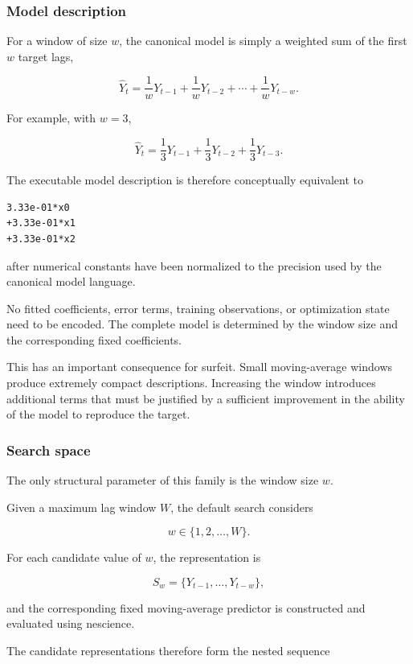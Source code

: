 \subsubsection{Model description}

For a window of size \(w\), the canonical model is simply a weighted sum of the
first \(w\) target lags,

\[
\widehat Y_t
=
\frac1wY_{t-1}
+
\frac1wY_{t-2}
+\cdots+
\frac1wY_{t-w}.
\]

For example, with \(w=3\),

\[
\widehat Y_t
=
\frac13Y_{t-1}
+
\frac13Y_{t-2}
+
\frac13Y_{t-3}.
\]

The executable model description is therefore conceptually equivalent to

\begin{verbatim}
3.33e-01*x0
+3.33e-01*x1
+3.33e-01*x2
\end{verbatim}

after numerical constants have been normalized to the precision used by the
canonical model language.

No fitted coefficients, error terms, training observations, or optimization
state need to be encoded. The complete model is determined by the window size
and the corresponding fixed coefficients.

This has an important consequence for surfeit. Small moving-average windows
produce extremely compact descriptions. Increasing the window introduces
additional terms that must be justified by a sufficient improvement in the
ability of the model to reproduce the target.

\subsubsection{Search space}

The only structural parameter of this family is the window size \(w\).

Given a maximum lag window \(W\), the default search considers

\[
w\in\{1,2,\ldots,W\}.
\]

For each candidate value of \(w\), the representation is

\[
S_w
=
\{
Y_{t-1},\ldots,Y_{t-w}
\},
\]

and the corresponding fixed moving-average predictor is constructed and
evaluated using nescience.

The candidate representations therefore form the nested sequence

